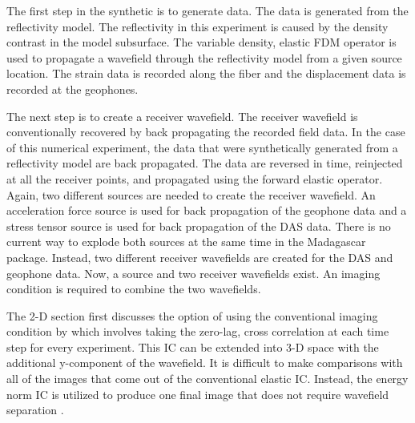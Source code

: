 The first step in the synthetic is to generate data. The data is generated from the reflectivity model. The reflectivity in this experiment is caused by the density contrast in the model subsurface. The variable density, elastic FDM operator is used to propagate a wavefield through the reflectivity model from a given source location. The strain data is recorded along the fiber and the displacement data is recorded at the geophones.

The next step is to create a receiver wavefield. The receiver wavefield is conventionally recovered by back propagating the recorded field data. In the case of this numerical experiment, the data that were synthetically generated from a reflectivity model are back propagated. The data are reversed in time, reinjected at all the receiver points, and propagated using the forward elastic operator. Again, two different sources are needed to create the receiver wavefield. An acceleration force source is used for back propagation of the geophone data and a stress tensor source is used for back propagation of the DAS data. There is no current way to explode both sources at the same time in the Madagascar package. Instead, two different receiver wavefields are created for the DAS and geophone data. Now, a source and two receiver wavefields exist. An imaging condition is required to combine the two wavefields.

The 2-D section first discusses the option of using the conventional imaging condition by \citet{claerbout1985imaging} which involves taking the zero-lag, cross correlation at each time step for every experiment. This IC can be extended into 3-D space with the additional y-component of the wavefield. It is difficult to make comparisons with all of the images that come out of the conventional elastic IC. Instead, the energy norm IC is utilized to produce one final image that does not require wavefield separation \citep{rocha2016isotropic}.
